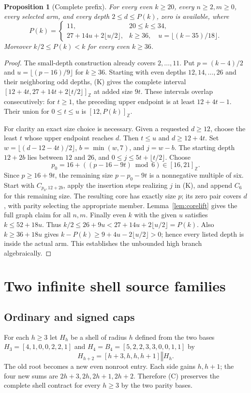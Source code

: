 \documentclass[11pt,a4paper]{article}
\newtheorem{proposition}[theorem]{Proposition}
\theoremstyle{definition}\newtheorem{definition}[theorem]{Definition}
\theoremstyle{remark}\newtheorem{remark}[theorem]{Remark}
\newcommand{\cat}{\mathbin{\Vert}}
\newcommand{\ints}[2]{[#1,#2]_{\mathbb Z}}
\begin{document}
\begin{proposition}[Complete prefix]\label{prop:prefix}
For every even $k\ge20$, every $n\ge2,m\ge0$, every selected arm,
and every depth $2\le d\le P(k)$, zero is available, where
\[
 P(k)=\begin{cases}
 11,&20\le k\le34,\\
 27+14u+2\lfloor u/2\rfloor,&k\ge36,
 \quad u=\lfloor(k-35)/18\rfloor.
 \end{cases}                                           \tag{P}
\]
Moreover $k/2\le P(k)<k$ for every even $k\ge36$.
\end{proposition}
\begin{proof}
The small-depth construction already covers $2,\ldots,11$.
Put $p=(k-4)/2$ and $u=\lfloor(p-16)/9\rfloor$ for $k\ge36$.
Starting with even depths $12,14,\ldots,26$ and their neighboring odd
depths, (K) gives the complete interval
$\ints{12+4t}{27+14t+2\lfloor t/2\rfloor}$ at added size $9t$.
These intervals overlap consecutively: for $t\ge1$, the preceding
upper endpoint is at least $12+4t-1$. Their union for $0\le t\le u$
is $\ints{12}{P(k)}$.

For clarity an exact size choice is necessary. Given a requested $d\ge12$,
choose the least $t$ whose upper endpoint reaches $d$.
Then $t\le u$ and $d\ge12+4t$. Set
$w=\lfloor(d-12-4t)/2\rfloor$, $b=\min(w,7)$, and $j=w-b$.
The starting depth $12+2b$ lies between $12$ and $26$, and
$0\le j\le5t+\lfloor t/2\rfloor$. Choose
\[
 p_0=16+((p-16-9t)\bmod6)\in\ints{16}{21}.
\]
Since $p\ge16+9t$, the remaining size $p-p_0-9t$ is a nonnegative
multiple of six. Start with $C_{p_0,12+2b}$, apply the insertion steps
realizing $j$ in (K), and append $C_6$ for this remaining size.
The resulting core has exactly size $p$; its zero pair covers $d$,
with parity selecting the appropriate member. Lemma~\ref{lem:corelift}
gives the full graph claim for all $n,m$.
Finally even $k$ with the given $u$ satisfies $k\le52+18u$. Thus
$k/2\le26+9u<27+14u+2\lfloor u/2\rfloor=P(k)$.
Also $k\ge36+18u$ gives
$k-P(k)\ge9+4u-2\lfloor u/2\rfloor>0$; hence every listed depth is
inside the actual arm. This establishes the unbounded high branch algebraically.
\end{proof}

\section{Two infinite shell source families}
\label{sec:families}
\subsection{Ordinary and signed caps}
For each $h\ge3$ let $H_h$ be a shell of radius $h$ defined from the
two bases $H_3=[4,1,0,0,2,2,1]$ and
$H_4=B_4=[5,2,2,3,3,0,0,1,1]$ by
\[
 H_{h+2}=[h+3,h,h,h+1]\cat H_h.                       \tag{C}
\]
The old root becomes a new even nonroot entry. Each side gains $h,h+1$;
the four new sums are $2h+3,2h,2h+1,2h+2$. Therefore (C) preserves
the complete shell contract for every $h\ge3$ by the two parity bases.
\end{document}

